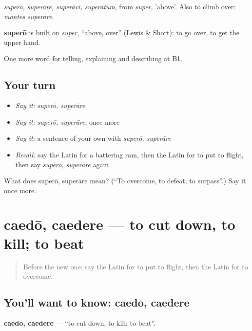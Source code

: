 \emph{superō, superāre, superāvī, superātum}, from \emph{super}, 'above'. Also to climb over: \emph{montēs superāre}.

\begin{cousinweb}
\textbf{superō} is built on \emph{super}, \textquotedblleft{}above, over\textquotedblright{} (Lewis \& Short): to go over, to get the upper hand.
\end{cousinweb}

\begin{grammarlens}[title={What you've built}]
One more word for telling, explaining and describing at B1.
\end{grammarlens}

\subsection*{Your turn}
\begin{itemize}
\raggedright
  \item \emph{Say it:} \emph{superō, superāre}
  \item \emph{Say it:} \emph{superō, superāre}, once more
  \item \emph{Say it:} a sentence of your own with \emph{superō, superāre}
  \item \emph{Recall:} say the Latin for a battering ram, then the Latin for to put to flight, then say \emph{superō, superāre} again
\end{itemize}

\begin{tcolorbox}[breakable,colback=teal!4,colframe=teal!35!black,title={Before you move on}]
What does superō, superāre mean? (\textquotedblleft{}To overcome, to defeat; to surpass\textquotedblright{}.) Say it once more.
\end{tcolorbox}
\section[caedō, caedere]{caedō, caedere — to cut down, to kill; to beat}

\label{lesson:LA-C342-caedo}



\begin{quote}
Before the new one: say the Latin for to put to flight, then the Latin for to overcome.
\end{quote}

\subsection*{You'll want to know: caedō, caedere}
\textbf{caedō, caedere} — \textquotedblleft{}to cut down, to kill; to beat\textquotedblright{}.

